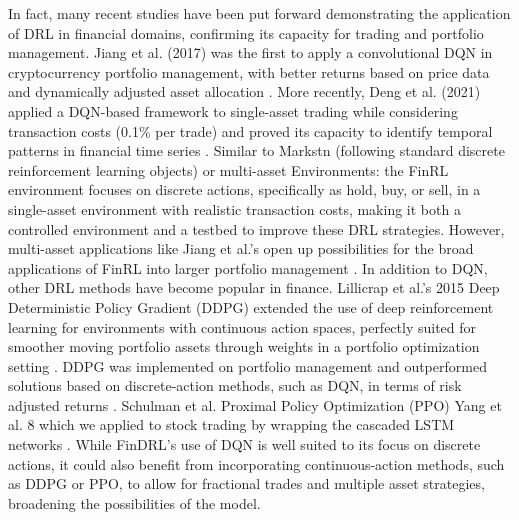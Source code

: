 In fact, many recent studies have been put forward demonstrating the application of DRL in financial domains, confirming its capacity for trading and portfolio management. Jiang et al. (2017) was the first to apply a convolutional DQN in cryptocurrency portfolio management, with better returns based on price data and dynamically adjusted asset allocation \cite{jiang_portfolio_2017}. More recently, Deng et al. (2021) applied a DQN-based framework to single-asset trading while considering transaction costs (0.1\% per trade) and proved its capacity to identify temporal patterns in financial time series \cite{deng_trading_2021}. Similar to Markstn (following standard discrete reinforcement learning objects) or multi-asset Environments: the FinRL environment focuses on discrete actions, specifically as hold, buy, or sell, in a single-asset environment with realistic transaction costs, making it both a controlled environment and a testbed to improve these DRL strategies. However, multi-asset applications like Jiang et al.'s open up possibilities for the broad applications of FinRL into larger portfolio management \cite{jiang_portfolio_2017}. In addition to DQN, other DRL methods have become popular in finance. Lillicrap et al.’s 2015 Deep Deterministic Policy Gradient (DDPG) extended the use of deep reinforcement learning for environments with continuous action spaces, perfectly suited for smoother moving portfolio assets through weights in a portfolio optimization setting \cite{lillicrap_ddpg_2015}. DDPG was implemented on portfolio management \cite{lillicrap_ddpg_2015} and outperformed solutions based on discrete-action methods, such as DQN, in terms of risk adjusted returns \cite{aboussalah_portfolio_2020}. Schulman et al. Proximal Policy Optimization (PPO) Yang et al. 8 which we applied to stock trading by wrapping the cascaded LSTM networks \cite{aboussalah_portfolio_2020}. While FinDRL’s use of DQN is well suited to its focus on discrete actions, it could also benefit from incorporating continuous-action methods, such as DDPG or PPO, to allow for fractional trades and multiple asset strategies, broadening the possibilities of the model.

